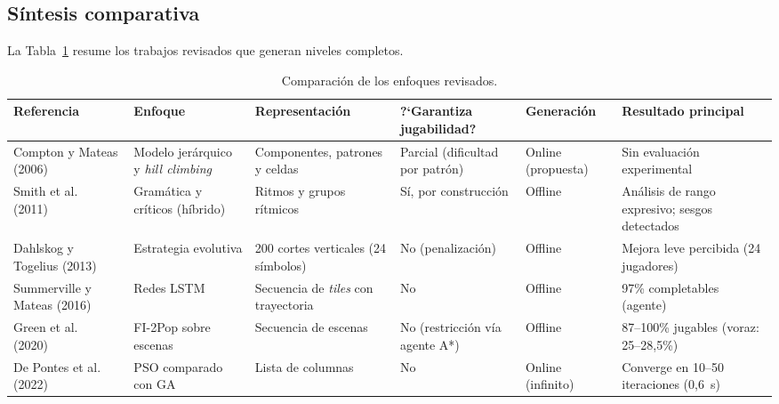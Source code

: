 \documentclass[letter, 10pt]{article}
\begin{document}
\subsection{S\'intesis comparativa}

La Tabla~\ref{tab:comp} resume los trabajos revisados que generan niveles completos.

\begin{table}[htbp]
\centering
\scriptsize
\begin{tabular}{|p{1.9cm}|p{2.0cm}|p{2.2cm}|p{1.9cm}|p{1.5cm}|p{2.3cm}|}
\hline
\raggedright \textbf{Referencia} & \raggedright \textbf{Enfoque} & \raggedright \textbf{Representaci\'on} & \raggedright \textbf{?`Garantiza jugabilidad?} & \raggedright \textbf{Generaci\'on} & \raggedright \textbf{Resultado principal} \tabularnewline
\hline
\raggedright Compton y Mateas (2006)~\cite{Compton2006} & \raggedright Modelo jer\'arquico y \emph{hill climbing} & \raggedright Componentes, patrones y celdas & \raggedright Parcial (dificultad por patr\'on) & \raggedright Online (propuesta) & \raggedright Sin evaluaci\'on experimental \tabularnewline
\hline
\raggedright Smith et al. (2011)~\cite{Smith2011} & \raggedright Gram\'atica y cr\'iticos (h\'ibrido) & \raggedright Ritmos y grupos r\'itmicos & \raggedright S\'i, por construcci\'on & \raggedright Offline & \raggedright An\'alisis de rango expresivo; sesgos detectados \tabularnewline
\hline
\raggedright Dahlskog y Togelius (2013)~\cite{Dahlskog2013} & \raggedright Estrategia evolutiva & \raggedright 200 cortes verticales (24 s\'imbolos) & \raggedright No (penalizaci\'on) & \raggedright Offline & \raggedright Mejora leve percibida (24 jugadores) \tabularnewline
\hline
\raggedright Summerville y Mateas (2016)~\cite{Summerville2016} & \raggedright Redes LSTM & \raggedright Secuencia de \emph{tiles} con trayectoria & \raggedright No & \raggedright Offline & \raggedright 97\% completables (agente) \tabularnewline
\hline
\raggedright Green et al. (2020)~\cite{Green2020} & \raggedright FI-2Pop sobre escenas & \raggedright Secuencia de escenas & \raggedright No (restricci\'on v\'ia agente A*) & \raggedright Offline & \raggedright 87--100\% jugables (voraz: 25--28,5\%) \tabularnewline
\hline
\raggedright De Pontes et al. (2022)~\cite{DePontes2022} & \raggedright PSO comparado con GA & \raggedright Lista de columnas & \raggedright No & \raggedright Online (infinito) & \raggedright Converge en 10--50 iteraciones (0,6~s) \tabularnewline
\hline
\end{tabular}
\caption{Comparaci\'on de los enfoques revisados.}
\label{tab:comp}
\end{table}
\end{document}
